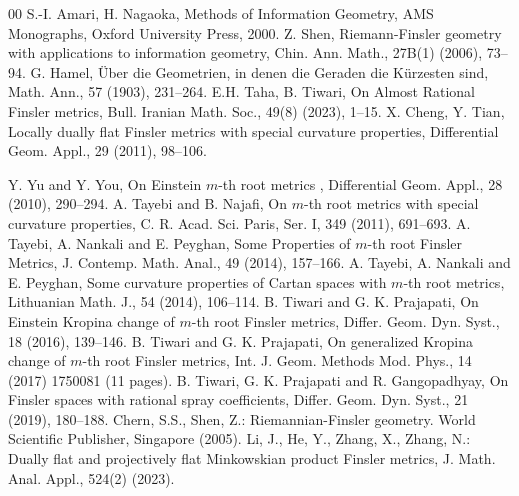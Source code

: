 \documentclass[12pt]{article}
\theoremstyle{definition}
\begin{document}
												
												\begin{thebibliography}{00}
													 S.-I. Amari, H. Nagaoka, Methods of Information Geometry, AMS Monographs, Oxford University Press, 2000.
													 Z. Shen, Riemann-Finsler geometry with applications to information geometry, Chin. Ann. Math., 27B(1) (2006), 73--94.
													 G. Hamel, Über die Geometrien, in denen die Geraden die Kürzesten sind, Math. Ann., 57 (1903), 231--264.
													 E.H. Taha, B. Tiwari, On Almost Rational Finsler metrics, Bull. Iranian Math. Soc., 49(8) (2023), 1--15.
													 X. Cheng, Y. Tian, Locally dually flat Finsler metrics with special curvature properties, Differential Geom. Appl., 29
													(2011), 98--106.
													
													  Y. Yu and Y. You, On Einstein $m$-th root metrics , Differential Geom. Appl., 28 (2010), 290--294.
													 A. Tayebi and B. Najafi, On $m$-th root metrics with special curvature properties, C. R. Acad. Sci. Paris, Ser. I, 349 (2011), 691--693.
													 A. Tayebi, A. Nankali and E. Peyghan, Some Properties of $m$-th root Finsler Metrics, J. Contemp. Math. Anal., 49 (2014), 157--166.
													 A. Tayebi, A. Nankali and E. Peyghan, Some curvature properties of Cartan spaces with $m$-th root metrics, Lithuanian Math. J., 54 (2014), 106--114.
													 B. Tiwari and G. K. Prajapati, On Einstein Kropina change of $m$-th root Finsler metrics, Differ. Geom. Dyn. Syst., 18 (2016), 139--146.
													 B. Tiwari and G. K. Prajapati, On generalized Kropina change of $m$-th root Finsler metrics, Int. J. Geom. Methods Mod. Phys., 14 (2017) 1750081 (11 pages).
													 B. Tiwari, G. K. Prajapati and R. Gangopadhyay, On Finsler spaces with rational spray coefficients, Differ. Geom. Dyn. Syst., 21 (2019), 180--188.
													 Chern, S.S., Shen, Z.: Riemannian-Finsler geometry. World Scientific Publisher, Singapore (2005).
													 Li, J., He, Y., Zhang, X., Zhang, N.: Dually flat and projectively flat Minkowskian product Finsler metrics, J. Math. Anal. Appl., 524(2) (2023).
												\end{thebibliography}
												
												
											
\end{document}

